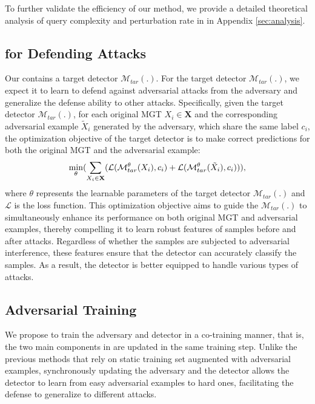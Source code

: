 To further validate the efficiency of our method, we provide a detailed theoretical analysis of query complexity and perturbation rate in \attackname in Appendix \ref{sec:analysis}. 

\subsection{ for Defending Attacks}
\label{DA}
Our  contains a target detector $\mathcal{M}_{tar}(.)$.
For the target detector $\mathcal{M}_{tar}(.)$, we expect it to learn to defend against adversarial attacks from the adversary and generalize the defense ability to other attacks. Specifically, given the target detector $\mathcal{M}_{tar}(.)$, for each original MGT $X_{i} \in \mathbf{X}$ and the corresponding adversarial example $\tilde{X}_{i}$ generated by the adversary, which share the same label $c_{i}$, the optimization objective of the target detector is to make correct predictions for both the original MGT and the adversarial example:
\begin{equation}
\label{eq:8}
\footnotesize
    \min_{\theta}(\sum_{X_{i}\in \mathbf{X}} (\mathcal{L}(\mathcal{M}^\theta_{tar}(X_{i}), c_{i})+\mathcal{L}(\mathcal{M}^\theta_{tar}(\tilde{X}_{i}), c_{i}))),
\end{equation}
where $\theta$ represents the learnable parameters of the target detector $\mathcal{M}_{tar}(.)$ and $\mathcal{L}$ is the loss function. 
This optimization objective aims to guide the $\mathcal{M}_{tar}(.)$ to simultaneously enhance its performance on both original MGT and adversarial examples, thereby compelling it to learn robust features of samples before and after attacks.
Regardless of whether the samples are subjected to adversarial interference, these features ensure that the detector can accurately classify the samples. As a result, the detector is better equipped to handle various types of attacks. 


\subsection{Adversarial Training}
\label{AT}
We propose to train the adversary and detector in a co-training manner, that is, the two main components in \modelname are updated in the same training step. 
Unlike the previous methods \cite{zhang2024random, huang2024cert,zeng2023certified} that rely on static training set augmented with adversarial examples, synchronously updating the adversary and the detector allows the detector to learn from easy adversarial examples to hard ones, facilitating the defense to generalize to different attacks.

